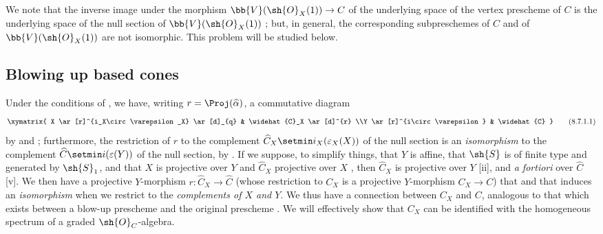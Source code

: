 We note that the inverse image under the morphism $\bb{V}(\sh{O}_X(1))\to C$ of the underlying space of the vertex prescheme of $C$ is the underlying space of the null section of $\bb{V}(\sh{O}_X(1))$ ;
but, in general, the corresponding subpreschemes of $C$ and of $\bb{V}(\sh{O}_X(1))$ are not isomorphic.
This problem will be studied below.


\subsection{Blowing up based cones}
\label{subsection:II.8.7}

\begin{env}[8.7.1]
\label{II.8.7.1}
Under the conditions of , we have, writing $r=\Proj(\widehat{\alpha})$, a commutative diagram
\[
\label{II.8.7.1.1}
  \xymatrix{
    X
      \ar[r]^{i_X\circ\varepsilon_X}
      \ar[d]_{q}
  & \widehat{C}_X
      \ar[d]^{r}
  \\Y
      \ar[r]^{i\circ\varepsilon}
  & \widehat{C}
  }
\tag{8.7.1.1}
\]
by  and ;
furthermore, the restriction of $r$ to the complement $\widehat{C}_X\setmin i_X(\varepsilon_X(X))$ of the null section is an \emph{isomorphism} to the complement $\widehat{C}\setmin i(\varepsilon(Y))$ of the null section, by .
If we suppose, to simplify things, that $Y$ is affine, that $\sh{S}$ is of finite type and generated by $\sh{S}_1$, and that $X$ is projective over $Y$ and $\widehat{C}_X$ projective over $X$ , then $\widehat{C}_X$ is projective over $Y$ [ii], and \emph{a fortiori} over $\widehat{C}$ [v].
We then have a projective $Y$-morphism $r:\widehat{C}_X\to\widehat{C}$ (whose restriction to $C_X$ is a projective $Y$-morphism $C_X\to C$) that  and that induces an \emph{isomorphism} when we restrict to the \emph{complements of $X$ and $Y$}.
We thus have a connection between $C_X$ and $C$, analogous to that which exists between a blow-up prescheme and the original prescheme .
We will effectively show that $C_X$ can be identified with the homogeneous spectrum of a graded $\sh{O}_C$-algebra.
\end{env}


